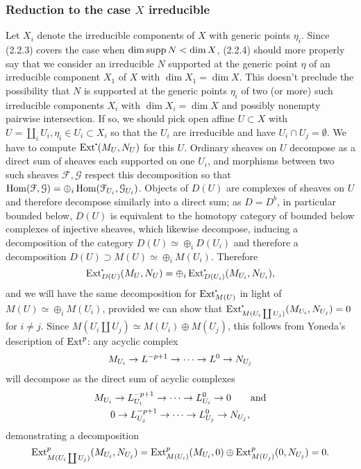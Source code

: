 \documentclass[deligne.tex]{subfiles}
\begin{document}
\subsubsection*{Reduction to the case $X$ irreducible}
Let $X_i$ denote the irreducible components of $X$ with generic points
$\eta_i$.
Since (2.2.3) covers the case when $\dim\operatorname{supp} N<\dim X$, (2.2.4) should more
properly say that we consider an irreducible $N$ supported at the generic
point $\eta$ of an irreducible component $X_1$ of $X$ with $\dim X_1=\dim X$.
This doesn't preclude the possibility that $N$ is supported at
the generic points $\eta_i$ of two (or more) such irreducible
components $X_i$ with $\dim X_i=\dim X$ and possibly nonempty pairwise
intersection. If so, we should pick open affine $U\subset X$
with $U=\coprod_i U_i,\eta_i\in U_i\subset X_i$ so that the $U_i$ are 
irreducible and have $U_i\cap U_j=\emptyset$.
We have to compute $\Ext^\dotp(M_U,N_U)$ for this $U$. Ordinary sheaves on
$U$ decompose as a direct sum of sheaves each supported on one $U_i$, and
morphisms between two such sheaves $\mathcal F,\mathcal G$ respect this
decomposition so that
$\operatorname{Hom}(\mathcal F,\mathcal G)=\oplus_i\operatorname{Hom}(\mathcal F_{U_i},\mathcal G_{U_i})$.
Objects of $D(U)$ are complexes of sheaves on $U$ and therefore decompose
similarly into a direct sum; as $D=D^b$, in particular bounded below,
$D(U)$ is equivalent to the homotopy category of bounded below 
complexes of injective sheaves, which likewise decompose, inducing a
decomposition of the category $D(U)\simeq\oplus_i D(U_i)$ and therefore
a decomposition $D(U)\supset M(U)\simeq\oplus_i M(U_i)$.
Therefore
\begin{equation*}
	\Ext^\dotp_{D(U)}(M_U,N_U)=\oplus_i\Ext^\dotp_{D(U_i)}(M_{U_i},N_{U_i}),
\end{equation*}
and we will have the same decomposition for $\Ext_{M(U)}^\dotp$ in light of
$M(U)\simeq\oplus_i M(U_i)$, provided we can show that
$\Ext^\dotp_{M(U_i\coprod U_j)}(M_{U_i},N_{U_j})=0$ for $i\ne j$.
Since $M(U_i\coprod U_j)\simeq M(U_i)\oplus M(U_j)$,
this follows from Yoneda's description of $\operatorname{Ext}^p$: any acyclic complex
\begin{equation*}
	M_{U_i}\rightarrow L^{-p+1}\rightarrow\cdots\rightarrow L^0\rightarrow N_{U_j}
\end{equation*}
will decompose as the direct sum of acyclic complexes
\begin{gather*}
	M_{U_i}\rightarrow L_{U_i}^{-p+1}\rightarrow\cdots\rightarrow L_{U_i}^0\rightarrow 0\qquad\text{and} \\
	0\rightarrow L_{U_j}^{-p+1}\rightarrow\cdots\rightarrow L_{U_j}^0\rightarrow N_{U_j},
\end{gather*}
demonstrating a decomposition
\begin{equation*}
	\operatorname{Ext}^p_{M(U_i\coprod U_j)}(M_{U_i},N_{U_j})=
	\operatorname{Ext}^p_{M(U_i)}(M_{U_i},0)\oplus\operatorname{Ext}^p_{M(U_j)}(0,N_{U_j})=0.
\end{equation*}
\end{document}
